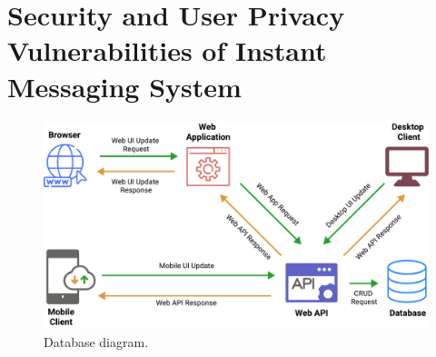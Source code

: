\section{Security and User Privacy Vulnerabilities of Instant Messaging System}
\label{sec:security-and-user-privacy-vulnerabilities-of-instant-messaging-system}

\begin{figure}[H]
    \centering
    \includegraphics[width=1.2\textwidth]{Pictures/Threat_Modeling}
    \caption{Database diagram.}\label{fig:figure6}
\end{figure}

